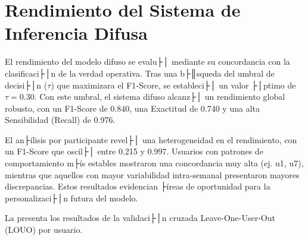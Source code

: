 \section{Rendimiento del Sistema de Inferencia Difusa}
\label{sec:rendimiento_sistema_difuso}

El rendimiento del modelo difuso se evalu├│ mediante su concordancia con la clasificaci├│n de la verdad operativa. Tras una b├║squeda del umbral de decisi├│n ($\tau$) que maximizara el F1-Score, se estableci├│ un valor ├│ptimo de $\tau = 0.30$. Con este umbral, el sistema difuso alcanz├│ un rendimiento global robusto, con un F1-Score de 0.840, una Exactitud de 0.740 y una alta Sensibilidad (Recall) de 0.976.

El an├ílisis por participante revel├│ una heterogeneidad en el rendimiento, con un F1-Score que oscil├│ entre 0.215 y 0.997. Usuarios con patrones de comportamiento m├ís estables mostraron una concordancia muy alta (ej. u1, u7), mientras que aquellos con mayor variabilidad intra-semanal presentaron mayores discrepancias. Estos resultados evidencian ├íreas de oportunidad para la personalizaci├│n futura del modelo.

La  presenta los resultados de la validaci├│n cruzada Leave-One-User-Out (LOUO) por usuario.

